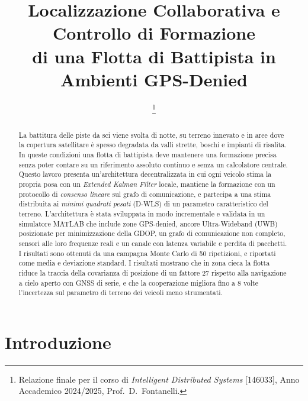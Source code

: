 \documentclass[conference,9pt]{IEEEtran}
\begin{document}
\title{Localizzazione Collaborativa e Controllo di Formazione\\
di una Flotta di Battipista in Ambienti GPS-Denied}

\author{
\thanks{Relazione finale per il corso di \emph{Intelligent Distributed Systems}
[146033], Anno Accademico 2024/2025, Prof.\ D.\ Fontanelli.}}

\maketitle

\begin{abstract}
La battitura delle piste da sci viene svolta di notte, su terreno innevato e
in aree dove la copertura satellitare \`e spesso degradata da valli strette,
boschi e impianti di risalita. In queste condizioni una flotta di battipista
deve mantenere una formazione precisa senza poter contare su un riferimento
assoluto continuo e senza un calcolatore centrale.
Questo lavoro presenta un'architettura decentralizzata in cui
ogni veicolo stima la propria posa con un \emph{Extended Kalman Filter} locale,
mantiene la formazione con un protocollo di \emph{consenso lineare} sul grafo
di comunicazione, e partecipa a una stima distribuita ai \emph{minimi quadrati
pesati} (D-WLS) di un parametro caratteristico del terreno.
L'architettura \`e stata sviluppata in modo incrementale e validata in un
simulatore MATLAB che include zone GPS-denied, ancore Ultra-Wideband (UWB)
posizionate per minimizzazione della GDOP, un grafo di comunicazione non
completo, sensori alle loro frequenze reali e un canale con latenza variabile
e perdita di pacchetti. I risultati sono ottenuti da una campagna Monte Carlo
di 50 ripetizioni, e riportati come media e deviazione standard.
I risultati mostrano che in zona cieca la flotta riduce la traccia della
covarianza di posizione di un fattore 27 rispetto alla navigazione a cielo
aperto con GNSS di serie, e che la cooperazione migliora fino a 8 volte
l'incertezza sul parametro di terreno dei veicoli meno strumentati.
\end{abstract}

\section{Introduzione}
\end{document}
